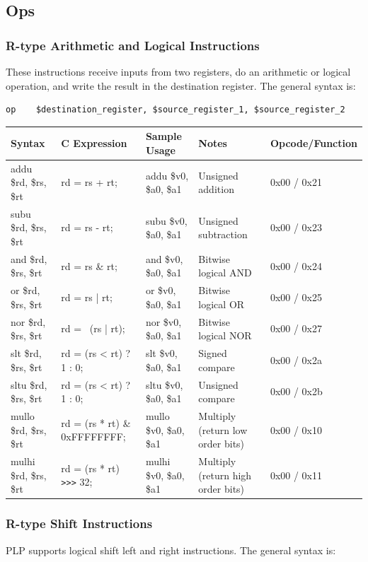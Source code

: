 \documentclass{article}
\begin{document}
\subsection{Ops}
\subsubsection{R-type Arithmetic and Logical Instructions}
These instructions receive inputs from two registers, do an arithmetic or logical operation, and write the result in the destination register. The general syntax is: 
\begin{verbatim}
op    $destination_register, $source_register_1, $source_register_2
\end{verbatim}
\begin{tabularx}{\linewidth}{|X|X|X|X|X|}
\hline
Syntax	& C Expression & Sample Usage & Notes & Opcode/Function \\
\hline
addu \$rd, \$rs, \$rt &	rd = rs + rt; &	addu \$v0, \$a0, \$a1 &	Unsigned addition & 0x00 / 0x21 \\
subu \$rd, \$rs, \$rt &	rd = rs - rt; &	subu \$v0, \$a0, \$a1 &	Unsigned subtraction & 0x00 / 0x23 \\
and \$rd, \$rs, \$rt &	rd = rs \& rt; & and \$v0, \$a0, \$a1 &	Bitwise logical AND &0x00 / 0x24 \\
or \$rd, \$rs, \$rt &	rd = rs | rt; &	or \$v0, \$a0, \$a1 &	Bitwise logical OR &0x00 / 0x25 \\
nor \$rd, \$rs, \$rt &	rd = ~(rs | rt); & nor \$v0, \$a0, \$a1 & Bitwise logical NOR & 0x00 / 0x27 \\
slt \$rd, \$rs, \$rt &	rd = (rs < rt) ? 1 : 0;	& slt \$v0, \$a0, \$a1 & Signed compare	& 0x00 / 0x2a \\
sltu \$rd, \$rs, \$rt &	rd = (rs < rt) ? 1 : 0;	& sltu \$v0, \$a0, \$a1	& Unsigned compare & 0x00 / 0x2b \\
mullo \$rd, \$rs, \$rt & rd = (rs * rt) \& 0xFFFFFFFF; & mullo \$v0, \$a0, \$a1	& Multiply (return low order bits) & 0x00 / 0x10 \\
mulhi \$rd, \$rs, \$rt & rd = (rs * rt) \verb+>>>+ 32; & mulhi \$v0, \$a0, \$a1 & Multiply (return high order bits) & 0x00 / 0x11 \\
\hline
\end{tabularx}
\subsubsection{R-type Shift Instructions}
PLP supports logical shift left and right instructions. The general syntax is:
\end{document}

